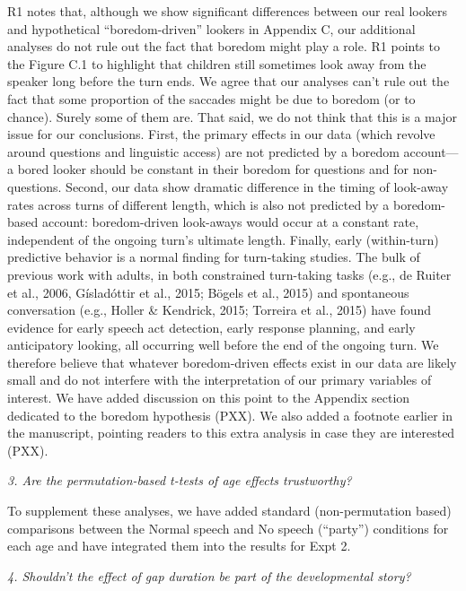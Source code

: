 \documentclass[11pt,a4paper]{letter} %
\begin{document}
\begin{letter}{}
\noindent R1 notes that, although we show significant differences between our real lookers and hypothetical ``boredom-driven'' lookers in Appendix C, our additional analyses do not rule out the fact that boredom might play a role. R1 points to the Figure C.1 to highlight that children still sometimes look away from the speaker long before the turn ends. We agree that our analyses can't rule out the fact that some proportion of the saccades might be due to boredom (or to chance). Surely some of them are. That said, we do not think that this is a major issue for our conclusions. First, the primary effects in our data (which revolve around questions and linguistic access) are not predicted by a boredom account---a bored looker should be constant in their boredom for questions and for non-questions.  Second, our data show dramatic difference in the timing of look-away rates across turns of different length, which is also not predicted by a boredom-based account: boredom-driven look-aways would occur at a constant rate, independent of the ongoing turn's ultimate length. Finally, early (within-turn) predictive behavior is a normal finding for turn-taking studies. The bulk of previous work with adults, in both constrained turn-taking tasks (e.g., de Ruiter et al., 2006, G\'{i}slad\'{o}ttir et al., 2015; B\"{o}gels et al., 2015) and spontaneous conversation (e.g., Holler \& Kendrick, 2015; Torreira et al., 2015) have found evidence for early speech act detection, early response planning, and early anticipatory looking, all occurring well before the end of the ongoing turn. We therefore believe that whatever boredom-driven effects exist in our data are likely small and do not interfere with the interpretation of our primary variables of interest. We have added discussion on this point to the Appendix section dedicated to the boredom hypothesis (PXX). We also added a footnote earlier in the manuscript, pointing readers to this extra analysis in case they are interested (PXX).

\noindent \textit{3. Are the permutation-based t-tests of age effects trustworthy?}

\noindent To supplement these analyses, we have added standard (non-permutation based) comparisons between the Normal speech and No speech (``party'') conditions for each age and have integrated them into the results for Expt 2.

\noindent \textit{4. Shouldn't the effect of gap duration be part of the developmental story?}


\end{letter}
\end{document}
